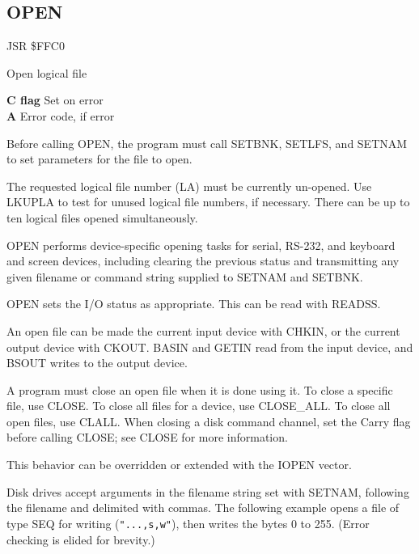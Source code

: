 \subsection{OPEN}
\label{KERNAL Jump Table!OPEN}
\begin{description}[leftmargin=2cm,style=nextline]
    \item [Address:] JSR \$FFC0
    \item [Description:] Open logical file
    \item [Outputs:]
        \textbf{C flag} Set on error \\
        \textbf{A} Error code, if error
    \item [Remarks:]
        Before calling OPEN, the program must call SETBNK, SETLFS, and SETNAM to set parameters for the file to open.

        The requested logical file number (LA) must be currently un-opened. Use LKUPLA to test for unused logical file numbers, if necessary. There can be up to ten logical files opened simultaneously.

        OPEN performs device-specific opening tasks for serial, RS-232, and keyboard and screen devices, including clearing the previous status and transmitting any given filename or command string supplied to SETNAM and SETBNK.

        OPEN sets the I/O status as appropriate. This can be read with READSS.

        An open file can be made the current input device with CHKIN, or the current output device with CKOUT. BASIN and GETIN read from the input device, and BSOUT writes to the output device.

        A program must close an open file when it is done using it. To close a specific file, use CLOSE. To close all files for a device, use CLOSE\_ALL. To close all open files, use CLALL. When closing a disk command channel, set the Carry flag before calling CLOSE; see CLOSE for more information.

        This behavior can be overridden or extended with the IOPEN vector.
    \item [Examples:]
        Disk drives accept arguments in the filename string set with SETNAM, following the filename and delimited with commas. The following example opens a file of type SEQ for writing (\texttt{"...,s,w"}), then writes the bytes 0 to 255. (Error checking is elided for brevity.)

\end{description}
